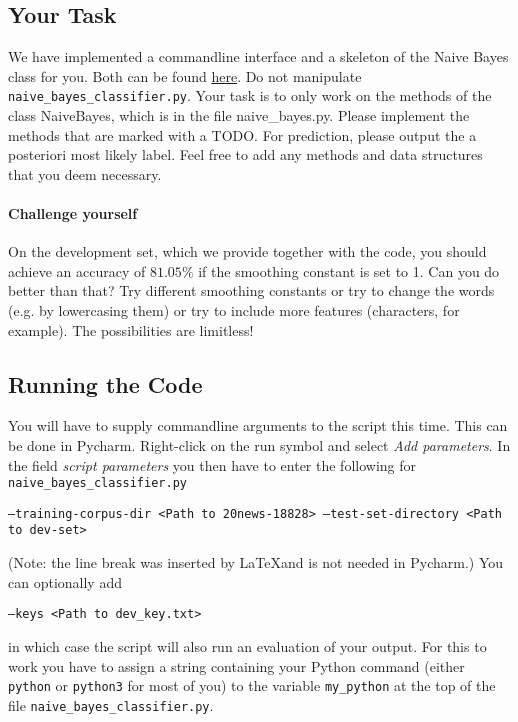 \documentclass[11pt, a4paper]{article}
\begin{document}
\subsection{Your Task}
We have implemented a commandline interface and a skeleton of the Naive Bayes class for you. Both can be 
found \href{https://github.com/BasicProbability/BasicProbability.github.io/raw/master/Homework/Programming/2016-17/Assignment4/prerequisites.zip}{here}. Do not manipulate \texttt{naive\_bayes\_classifier.py}. Your task is to only work on the methods of the class NaiveBayes, which is in the file naive\_bayes.py. Please implement the methods that are marked with a TODO. For prediction, please output the 
a posteriori most likely label. Feel free to add any methods and data structures that you deem necessary.

\paragraph{Challenge yourself} On the development set, which we provide together with the code, you
should achieve an accuracy of $ 81.05\% $ if the smoothing constant is set to 1. Can you do better
than that? Try different smoothing constants or try to change the words (e.g. by lowercasing them) or
try to include more features (characters, for example). The possibilities are limitless! 

\subsection{Running the Code}
You will have to supply commandline arguments to the script this time. This can be done in Pycharm. 
Right-click on the run symbol and select \textit{Add parameters}. In the field \textit{script parameters}
you then have to enter the following for \texttt{naive\_bayes\_classifier.py}
\begin{center}
\texttt{--training-corpus-dir <Path to 20news-18828> --test-set-directory <Path to dev-set>}
\end{center}
(Note: the line break was inserted by \LaTeX and is not needed in Pycharm.)
You can optionally add
\begin{center}
\texttt{--keys <Path to dev\_key.txt>}
\end{center}
in which case the script will also run an evaluation of your output. For this to work you have to assign
a string containing your Python command (either \texttt{python} or \texttt{python3} for most of you)
to the variable \texttt{my\_python} at the top of the file \texttt{naive\_bayes\_classifier.py}.
\end{document}
